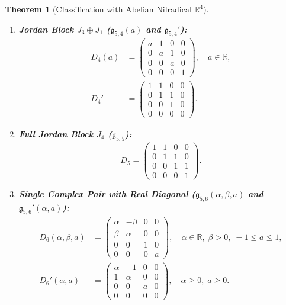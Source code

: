 \documentclass[11pt,a4paper]{article}
\newtheorem{theorem}{Theorem}[section]
\theoremstyle{definition}
\theoremstyle{remark}
\newcommand{\R}{\mathbb{R}}
\newcommand{\g}{\mathfrak{g}}
\begin{document}
\begin{theorem}[Classification with Abelian Nilradical $\R^4$]
\begin{enumerate}
    \item \textbf{Jordan Block $J_3 \oplus J_1$ ($\g_{5,4}(a)$ and $\g_{5,4}'$):}
    \begin{align}
        D_4(a) &= \begin{pmatrix} a & 1 & 0 & 0 \\ 0 & a & 1 & 0 \\ 0 & 0 & a & 0 \\ 0 & 0 & 0 & 1 \end{pmatrix}, \quad a \in \R, \\
        D_4' &= \begin{pmatrix} 1 & 1 & 0 & 0 \\ 0 & 1 & 1 & 0 \\ 0 & 0 & 1 & 0 \\ 0 & 0 & 0 & 0 \end{pmatrix}.
    \end{align}
    
    \item \textbf{Full Jordan Block $J_4$ ($\g_{5,5}$):}
    \begin{equation}
        D_5 = \begin{pmatrix} 1 & 1 & 0 & 0 \\ 0 & 1 & 1 & 0 \\ 0 & 0 & 1 & 1 \\ 0 & 0 & 0 & 1 \end{pmatrix}.
    \end{equation}
    
    \item \textbf{Single Complex Pair with Real Diagonal ($\g_{5,6}(\alpha, \beta, a)$ and $\g_{5,6}'(\alpha, a)$):}
    \begin{align}
        D_6(\alpha, \beta, a) &= \begin{pmatrix} \alpha & -\beta & 0 & 0 \\ \beta & \alpha & 0 & 0 \\ 0 & 0 & 1 & 0 \\ 0 & 0 & 0 & a \end{pmatrix}, \quad \alpha \in \R, \; \beta > 0, \; -1 \le a \le 1, \\
        D_6'(\alpha, a) &= \begin{pmatrix} \alpha & -1 & 0 & 0 \\ 1 & \alpha & 0 & 0 \\ 0 & 0 & a & 0 \\ 0 & 0 & 0 & 0 \end{pmatrix}, \quad \alpha \ge 0, \; a \ge 0.
    \end{align}
    

\end{enumerate}
\end{theorem}
\end{document}
